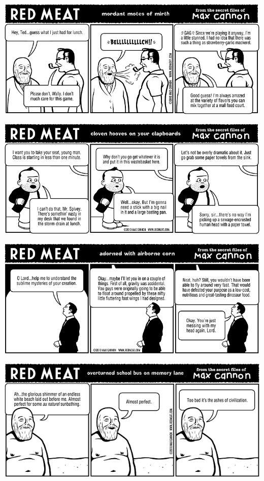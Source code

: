 \documentclass[a4paper,twoside,11pt]{article}
\begin{document}
\includegraphics[width=\textwidth]{redmeat_2010-02-09.png}



\includegraphics[width=\textwidth]{redmeat_2010-02-16.png}



\includegraphics[width=\textwidth]{redmeat_2010-02-23.png}



\includegraphics[width=\textwidth]{redmeat_2010-03-02.png}
\end{document}
